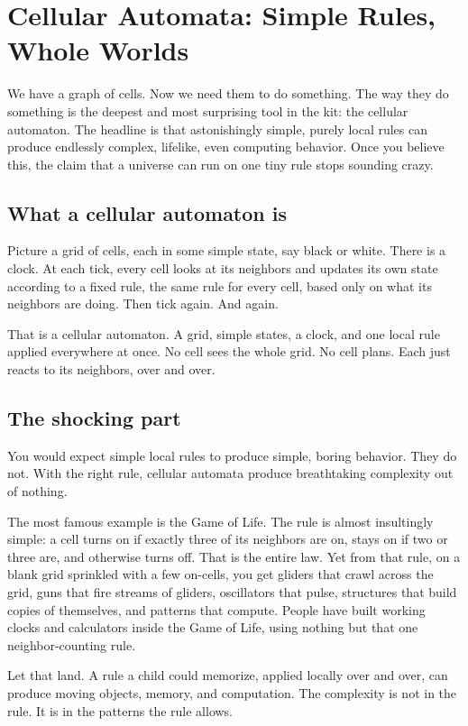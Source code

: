\section{Cellular Automata: Simple Rules, Whole Worlds}

We have a graph of cells. Now we need them to do something. The way they do something is the deepest and most surprising tool in the kit: the cellular automaton. The headline is that astonishingly simple, purely local rules can produce endlessly complex, lifelike, even computing behavior. Once you believe this, the claim that a universe can run on one tiny rule stops sounding crazy.

\subsection{What a cellular automaton is}

Picture a grid of cells, each in some simple state, say black or white. There is a clock. At each tick, every cell looks at its neighbors and updates its own state according to a fixed rule, the same rule for every cell, based only on what its neighbors are doing. Then tick again. And again.

That is a cellular automaton. A grid, simple states, a clock, and one local rule applied everywhere at once. No cell sees the whole grid. No cell plans. Each just reacts to its neighbors, over and over.

\subsection{The shocking part}

You would expect simple local rules to produce simple, boring behavior. They do not. With the right rule, cellular automata produce breathtaking complexity out of nothing.

The most famous example is the Game of Life. The rule is almost insultingly simple: a cell turns on if exactly three of its neighbors are on, stays on if two or three are, and otherwise turns off. That is the entire law. Yet from that rule, on a blank grid sprinkled with a few on-cells, you get gliders that crawl across the grid, guns that fire streams of gliders, oscillators that pulse, structures that build copies of themselves, and patterns that compute. People have built working clocks and calculators inside the Game of Life, using nothing but that one neighbor-counting rule.

Let that land. A rule a child could memorize, applied locally over and over, can produce moving objects, memory, and computation. The complexity is not in the rule. It is in the patterns the rule allows.

